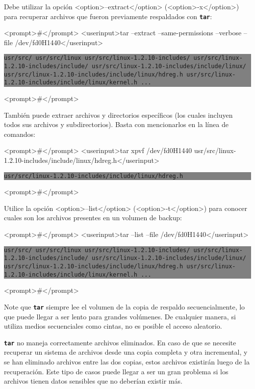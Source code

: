 ﻿\documentclass[12pt]{article}
\begin{document}
	

Debe utilizar la opción  <option>--extract</option> (<option>-x</option>) para recuperar archivos que fueron 
previamente respaldados con \texttt{\textbf{tar}}:


<prompt>#</prompt> <userinput>tar --extract --same-permissions 
--verbose --file 
/dev/fd0H1440</userinput>
\colorbox{grey}{\parbox[t]{0.95\linewidth}{ \vspace*{0.5cm} {\tt usr/src/
usr/src/linux
usr/src/linux-1.2.10-includes/
usr/src/linux-1.2.10-includes/include/
usr/src/linux-1.2.10-includes/include/linux/
usr/src/linux-1.2.10-includes/include/linux/hdreg.h
usr/src/linux-1.2.10-includes/include/linux/kernel.h
... } \vspace*{0.5cm} } } 
<prompt>#</prompt>



También puede extraer archivos y directorios específicos (los cuales incluyen 
todos sus archivos y subdirectorios). Basta con mencionarlos en la línea de comandos:


<prompt>#</prompt> <userinput>tar xpvf /dev/fd0H1440 
usr/src/linux-1.2.10-includes/include/linux/hdreg.h</userinput>
\colorbox{grey}{\parbox[t]{0.95\linewidth}{ \vspace*{0.5cm} {\tt usr/src/linux-1.2.10-includes/include/linux/hdreg.h } \vspace*{0.5cm} } } 
<prompt>#</prompt>



Utilice la opción <option>--list</option> (<option>-t</option>) para conocer cuales son los archivos presentes en un 
volumen de backup:


<prompt>#</prompt> <userinput>tar --list --file 
/dev/fd0H1440</userinput>
\colorbox{grey}{\parbox[t]{0.95\linewidth}{ \vspace*{0.5cm} {\tt usr/src/
usr/src/linux
usr/src/linux-1.2.10-includes/
usr/src/linux-1.2.10-includes/include/
usr/src/linux-1.2.10-includes/include/linux/
usr/src/linux-1.2.10-includes/include/linux/hdreg.h
usr/src/linux-1.2.10-includes/include/linux/kernel.h
... } \vspace*{0.5cm} } } 
<prompt>#</prompt>



Note que \texttt{\textbf{tar}} siempre lee el volumen de la copia de respaldo secuencialmente, 
lo que puede llegar a ser lento para grandes volúmenes. 
De cualquier manera, si utiliza medios secuenciales como cintas, no 
es posible el acceso aleatorio.
	
	 \texttt{\textbf{tar}}
no maneja correctamente archivos eliminados. En caso de que se necesite recuperar un 
sistema de archivos desde una copia completa y otra incremental, y se han 
eliminado archivos entre las dos copias, estos archivos existirán luego de
la recuperación. Este tipo de casos puede llegar a ser un gran problema si los archivos 
tienen datos sensibles que no deberían existir más.
\end{document}

